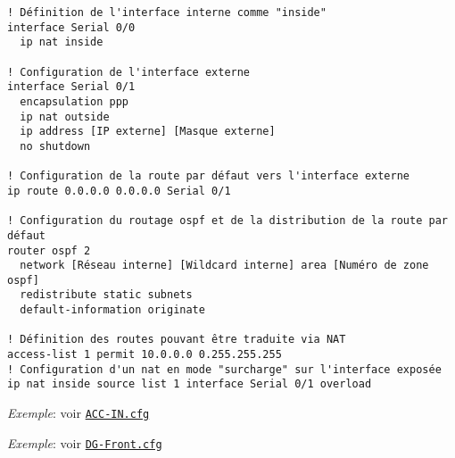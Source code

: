 \documentclass{article}
\newcommand{\seefile}[1]{
  \begin{center}
  \begin{minipage}{0.9\textwidth}
    \emph{Exemple}: voir \texttt{\href{https://github.com/EpicKiwi/Wide-Network-Project-Cesi-A4/blob/master/network/#1}{#1}}
  \end{minipage}
  \end{center}
}
\begin{document}
\begin{lstlisting}[caption=Configuration d'un accès internet avec NAT]
! Définition de l'interface interne comme "inside"
interface Serial 0/0
  ip nat inside

! Configuration de l'interface externe
interface Serial 0/1
  encapsulation ppp
  ip nat outside
  ip address [IP externe] [Masque externe]
  no shutdown

! Configuration de la route par défaut vers l'interface externe
ip route 0.0.0.0 0.0.0.0 Serial 0/1

! Configuration du routage ospf et de la distribution de la route par défaut
router ospf 2
  network [Réseau interne] [Wildcard interne] area [Numéro de zone ospf]
  redistribute static subnets
  default-information originate

! Définition des routes pouvant être traduite via NAT
access-list 1 permit 10.0.0.0 0.255.255.255
! Configuration d'un nat en mode "surcharge" sur l'interface exposée
ip nat inside source list 1 interface Serial 0/1 overload
\end{lstlisting}

\seefile{ACC-IN.cfg}
\seefile{DG-Front.cfg}
\end{document}
